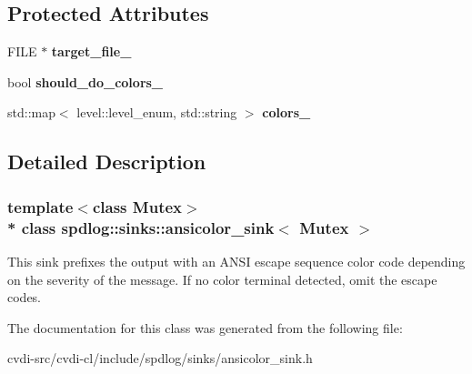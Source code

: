 \subsection*{Protected Attributes}
\begin{DoxyCompactItemize}
\item 
F\+I\+LE $\ast$ {\bfseries target\+\_\+file\+\_\+}\hypertarget{classspdlog_1_1sinks_1_1ansicolor__sink_abeea2ab4923f8bae0c74e0f65a1ebcd6}{}\label{classspdlog_1_1sinks_1_1ansicolor__sink_abeea2ab4923f8bae0c74e0f65a1ebcd6}

\item 
bool {\bfseries should\+\_\+do\+\_\+colors\+\_\+}\hypertarget{classspdlog_1_1sinks_1_1ansicolor__sink_a4d4ee5bb5b9953f5f150be371d8a9f0e}{}\label{classspdlog_1_1sinks_1_1ansicolor__sink_a4d4ee5bb5b9953f5f150be371d8a9f0e}

\item 
std\+::map$<$ level\+::level\+\_\+enum, std\+::string $>$ {\bfseries colors\+\_\+}\hypertarget{classspdlog_1_1sinks_1_1ansicolor__sink_a27337af3c5d95e97befd4dfc10a4ca60}{}\label{classspdlog_1_1sinks_1_1ansicolor__sink_a27337af3c5d95e97befd4dfc10a4ca60}

\end{DoxyCompactItemize}


\subsection{Detailed Description}
\subsubsection*{template$<$class Mutex$>$\\*
class spdlog\+::sinks\+::ansicolor\+\_\+sink$<$ Mutex $>$}

This sink prefixes the output with an A\+N\+SI escape sequence color code depending on the severity of the message. If no color terminal detected, omit the escape codes. 

The documentation for this class was generated from the following file\+:\begin{DoxyCompactItemize}
\item 
cvdi-\/src/cvdi-\/cl/include/spdlog/sinks/ansicolor\+\_\+sink.\+h\end{DoxyCompactItemize}
